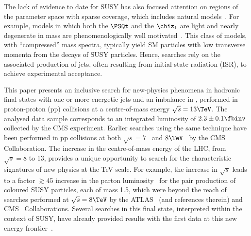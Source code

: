 The lack of evidence to date for SUSY has also focused attention on
regions of the parameter space with sparse coverage, which includes
natural models~\cite{Delgado:2012eu, Boehm:1999tr, Carena:2008mj,
  Grober:2014aha, Grober:2015fia}. For example, models in which both
the $\PSQt$ and the $\chiz_1$ are light and nearly degenerate in mass
are phenomenologically well motivated~\cite{Boehm:1999bj,
  Balazs:2004bu, Martin:2007gf, Martin:2007hn}. This class of models,
with ``compressed'' mass spectra, typically yield SM particles with
low transverse momenta from the decays of SUSY particles. Hence,
searches rely on the associated production of jets, often resulting
from initial-state radiation (ISR), to achieve experimental
acceptance.

This paper presents an inclusive search for new-physics phenomena in
hadronic final states with one or more energetic jets and an imbalance
in \ptvecmiss, performed in proton-proton (pp) collisions at a
centre-of-mass energy $\sqrt{s} = 13\TeV$. The analysed data sample
corresponds to an integrated luminosity of $2.3 \pm 0.1
\fbinv$ %
collected by the CMS experiment. Earlier searches using the same
technique have been performed in pp collisions at both $\sqrt{s} =
7$~\cite{RA1Paper, RA1Paper2011, RA1Paper2011FULL} and
$8\TeV$~\cite{RA1Paper2012, RA1Parked} by the CMS Collaboration.
The increase in the centre-of-mass energy of the LHC, from $\sqrt{s} =
8$ to 13\TeV, provides a unique opportunity to search for the
characteristic signatures of new physics at the TeV scale. For
example, the increase in $\sqrt{s}$ leads to a factor $\gtrsim$45
increase in the parton luminosity~\cite{Martin:2009iq} for the pair
production of coloured SUSY particles, each of mass 1.5\TeV, which
were beyond the reach of searches performed at $\sqrt{s} = 8\TeV$ by
the ATLAS~\cite{Aad:2015iea, Aad:2015pfx} (and references therein) and
CMS~\cite{CMS:2014dpa, Khachatryan:2015vra, Khachatryan:2016oia,
  Chatrchyan:2013wxa, Chatrchyan:2014lfa, Khachatryan:2015pwa,
  Khachatryan:2015wza, Khachatryan:2016zcu} Collaborations. Several
searches in this final state, interpreted within the context of SUSY,
have already provided results with the first data at this new energy
frontier~\cite{Aad:2016jxj, Aaboud:2016tnv, Aaboud:2016zdn,
  Aad:2016eki, Aaboud:2016nwl, Khachatryan:2016kdk, cms-13}.

